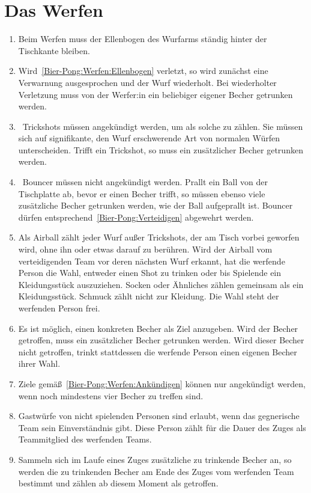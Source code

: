 \section{Das Werfen}
\begin{enumerate}[label={(\arabic*)}]
    \item\label{Bier-Pong:Werfen:Ellenbogen}
    Beim Werfen muss der Ellenbogen des Wurfarms ständig hinter der Tischkante bleiben.

    \item
    Wird~\ref{Bier-Pong:Werfen:Ellenbogen} verletzt, so wird zunächst eine Verwarnung ausgesprochen und der Wurf wiederholt.
    Bei wiederholter Verletzung muss von der Werfer:in ein beliebiger eigener Becher getrunken werden.

    \item
~\glqq{}Trickshots\grqq{} müssen angekündigt werden, um als solche zu zählen.
    Sie müssen sich auf signifikante, den Wurf erschwerende Art von normalen Würfen unterscheiden.
    Trifft ein Trickshot, so muss ein zusätzlicher Becher getrunken werden.

    \item
~\glqq{}Bouncer\grqq{} müssen nicht angekündigt werden.
    Prallt ein Ball von der Tischplatte ab, bevor er einen Becher trifft, so müssen ebenso viele zusätzliche Becher getrunken werden, wie der Ball aufgeprallt ist.
    Bouncer dürfen entsprechend~\ref{Bier-Pong:Verteidigen} abgewehrt werden.

    \item
    Als \glqq{}Airball\grqq{} zählt jeder Wurf außer Trickshots, der am Tisch vorbei geworfen wird, ohne ihn oder etwas darauf zu berühren.
    Wird der Airball vom verteidigenden Team vor deren nächsten Wurf erkannt, hat die werfende Person die Wahl, entweder einen Shot zu trinken oder bis Spielende ein Kleidungsstück auszuziehen.
    Socken oder Ähnliches zählen gemeinsam als ein Kleidungsstück.
    Schmuck zählt nicht zur Kleidung.
    Die Wahl steht der werfenden Person frei.

    \item\label{Bier-Pong:Werfen:Ankündigen}
    Es ist möglich, einen konkreten Becher als Ziel anzugeben.
    Wird der Becher getroffen, muss ein zusätzlicher Becher getrunken werden.
    Wird dieser Becher nicht getroffen, trinkt stattdessen die werfende Person einen eigenen Becher ihrer Wahl.

    \item
    Ziele gemäß~\ref{Bier-Pong:Werfen:Ankündigen} können nur angekündigt werden, wenn noch mindestens vier Becher zu treffen sind.

    \item
    Gastwürfe von nicht spielenden Personen sind erlaubt, wenn das gegnerische Team sein Einverständnis gibt.
    Diese Person zählt für die Dauer des Zuges als Teammitglied des werfenden Teams.

    \item
    Sammeln sich im Laufe eines Zuges zusätzliche zu trinkende Becher an, so werden die zu trinkenden Becher am Ende des Zuges vom werfenden Team bestimmt und zählen ab diesem Moment als getroffen.
\end{enumerate}

